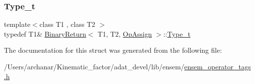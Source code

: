 \mbox{\label{structBinaryReturn_3_01T1_00_01T2_00_01OpAssign_01_4_a53342a562eafe32bec01f522b2e76d49}} 
\subsubsection{\texorpdfstring{Type\_t}{Type\_t}\hspace{0.1cm}{\footnotesize\ttfamily [2/2]}}
{\footnotesize\ttfamily template$<$class T1 , class T2 $>$ \\
typedef T1\& \mbox{\hyperlink{structBinaryReturn}{Binary\+Return}}$<$ T1, T2, \mbox{\hyperlink{structOpAssign}{Op\+Assign}} $>$\+::\mbox{\hyperlink{structBinaryReturn_3_01T1_00_01T2_00_01OpAssign_01_4_a53342a562eafe32bec01f522b2e76d49}{Type\+\_\+t}}}



The documentation for this struct was generated from the following file\+:\begin{DoxyCompactItemize}
\item 
/\+Users/archanar/\+Kinematic\+\_\+factor/adat\+\_\+devel/lib/ensem/\mbox{\hyperlink{lib_2ensem_2ensem__operator__tags_8h}{ensem\+\_\+operator\+\_\+tags.\+h}}\end{DoxyCompactItemize}
